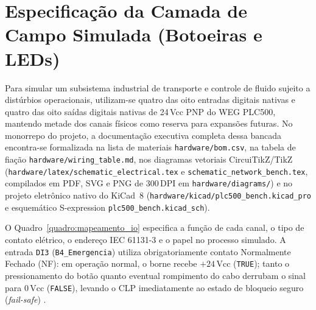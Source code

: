 \begin{figure}[htb]
{%
  }
\end{figure}

\section{Especificação da Camada de Campo Simulada (Botoeiras e LEDs)}
\label{sec:arq_campo}

Para simular um subsistema industrial de transporte e controle de fluido sujeito a distúrbios operacionais, utilizam-se quatro das oito entradas digitais nativas e quatro das oito saídas digitais nativas de 24\,Vcc PNP do WEG PLC500, mantendo metade dos canais físicos como reserva para expansões futuras. No monorrepo do projeto, a documentação executiva completa dessa bancada encontra-se formalizada na lista de materiais \texttt{hardware/\allowbreak bom.csv}, na tabela de fiação \texttt{hardware/\allowbreak wiring\_\allowbreak table.md}, nos diagramas vetoriais CircuiTikZ/TikZ (\texttt{hardware/\allowbreak latex/\allowbreak schematic\_\allowbreak electrical.tex} e \texttt{schematic\_\allowbreak network\_\allowbreak bench.tex}, compilados em PDF, SVG e PNG de $300\,\text{DPI}$ em \texttt{hardware/\allowbreak diagrams/}) e no projeto eletrônico nativo do KiCad~8 (\texttt{hardware/\allowbreak kicad/\allowbreak plc500\_\allowbreak bench.kicad\_\allowbreak pro} e esquemático S-expression \texttt{plc500\_\allowbreak bench.kicad\_\allowbreak sch}).

O Quadro~\ref{quadro:mapeamento_io} especifica a função de cada canal, o tipo de contato elétrico, o endereço IEC 61131-3 e o papel no processo simulado. A entrada \texttt{DI3} (\texttt{B4\_Emergencia}) utiliza obrigatoriamente contato Normalmente Fechado (NF): em operação normal, o borne recebe $+24\,\text{Vcc}$ (\texttt{TRUE}); tanto o pressionamento do botão quanto eventual rompimento do cabo derrubam o sinal para $0\,\text{Vcc}$ (\texttt{FALSE}), levando o CLP imediatamente ao estado de bloqueio seguro (\textit{fail-safe}) \cite{moraes_castrucci}.

